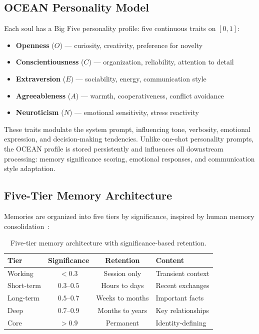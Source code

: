 \documentclass{article}
\begin{document}
\subsection{OCEAN Personality Model}

Each soul has a Big Five personality profile: five continuous traits on $[0, 1]$:

\begin{itemize}[leftmargin=*, topsep=2pt, itemsep=1pt]
  \item \textbf{Openness} ($O$) --- curiosity, creativity, preference for novelty
  \item \textbf{Conscientiousness} ($C$) --- organization, reliability, attention to detail
  \item \textbf{Extraversion} ($E$) --- sociability, energy, communication style
  \item \textbf{Agreeableness} ($A$) --- warmth, cooperativeness, conflict avoidance
  \item \textbf{Neuroticism} ($N$) --- emotional sensitivity, stress reactivity
\end{itemize}

These traits modulate the system prompt, influencing tone, verbosity, emotional expression, and decision-making tendencies. Unlike one-shot personality prompts, the OCEAN profile is stored persistently and influences all downstream processing: memory significance scoring, emotional responses, and communication style adaptation.

\subsection{Five-Tier Memory Architecture}

Memories are organized into five tiers by significance, inspired by human memory consolidation~\cite{mcgaugh2000memory}:

\begin{table}[h]
\centering
\small
\begin{tabular}{@{}lccl@{}}
\toprule
\textbf{Tier} & \textbf{Significance} & \textbf{Retention} & \textbf{Content} \\
\midrule
Working   & $< 0.3$ & Session only & Transient context \\
Short-term & $0.3$--$0.5$ & Hours to days & Recent exchanges \\
Long-term  & $0.5$--$0.7$ & Weeks to months & Important facts \\
Deep       & $0.7$--$0.9$ & Months to years & Key relationships \\
Core       & $> 0.9$ & Permanent & Identity-defining \\
\bottomrule
\end{tabular}
\caption{Five-tier memory architecture with significance-based retention.}
\label{tab:memory-tiers}
\end{table}
\end{document}

